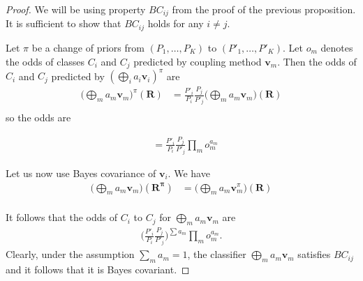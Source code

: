 \begin{proof}
We will be using property $BC_{ij}$ from the proof of the previous proposition. It is sufficient to show that $BC_{ij}$ holds for any $i\not= j$. 

Let $\pi$ be a change of priors from $(P_1, \ldots, P_K)$  to $(P'_1, \ldots, P'_K)$. Let $o_m$ denotes the odds of classes $C_i$ and $C_j$ predicted by coupling method $\boldsymbol{v}_m$. Then the odds of $C_i$ and $C_j$ predicted by $(\bigoplus_i a_i \boldsymbol{v}_i)^\pi$ are 
\begin{align}
	\biggl(\bigoplus_m a_m \boldsymbol{v}_m\biggr)^\pi(\boldsymbol{R}) & = \frac{P'_i}{P_i} \frac{P_j}{P'_j} \biggl(\bigoplus_m a_m \boldsymbol{v}_m\biggr)(\boldsymbol{R}) \\
\end{align}
so the odds are 

\begin{align}
	&= \frac{P'_i}{P_i} \frac{P_j}{P'_j} \prod_m o_m^{a_m}
\end{align}

Let us now use Bayes covariance of $\boldsymbol{v}_i$. 
We have
\begin{align}
	\biggl(\bigoplus_m a_m \boldsymbol{v}_m\biggr)(\boldsymbol{R^\pi}) & =  \biggl(\bigoplus_m a_m \boldsymbol{v}_m^\pi\biggr)(\boldsymbol{R}) \\
\end{align}

It follows that the odds of $C_i$ to $C_j$ for $\bigoplus_m a_m \boldsymbol{v}_m$ are 
\begin{align}
\biggl(\frac{P'_i}{P_i} \frac{P_j}{P'_j} \biggr)^{\sum a_m} \prod_m o_m^{a_m}.
\end{align}
Clearly, under the assumption $\sum_m a_m = 1$, the classifier $\bigoplus_m a_m \boldsymbol{v}_m$ satisfies $BC_{ij}$ and it follows that it is Bayes covariant.
\end{proof}


% 

